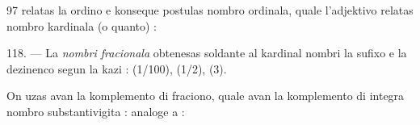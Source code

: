 \begin{VUpage}[101]{97}
 relatas la ordino e konseque postulas nombro\nl
ordinala, quale l'adjektivo  relatas nombro kardinala\nl
(o quanto) : \nl
{}

\VUblanc{5.66pt}%
118. --- La \textit{nombri fracionala} obtenesas soldante al\nl
kardinal nombri la sufixo  e la dezinenco  segun\nl
la kazi :  (1/100),  (1/2), \nl
{} (3).

On uzas  avan la komplemento di fraciono, quale avan\nl
la komplemento di integra nombro substantivigita : \nl
{} analoge a : 
\end{VUpage}

